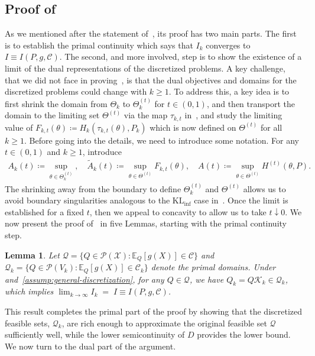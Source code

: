 \documentclass{article}
\theoremstyle{plain}
\newtheorem{lemma}[lemma]{Lemma}
\theoremstyle{definition}
\newcommand{\KLinf}{\operatorname{KL_{inf}}}
\newcommand{\calP}{\mathcal P}
\newcommand{\calC}{\mathcal C}
\newcommand{\calQ}{\mathcal Q}
\newcommand{\calX}{\mathcal X}
\newcommand{\calK}{\mathcal{K}}
\begin{document}
\subsection{Proof of~}
As we mentioned after the statement of~, its proof has two main parts. The first is to establish the primal continuity which says that $I_k$ converges to $I \equiv I(P, g, \calC)$. The second, and more involved, step is to show the existence of a limit of the dual representations of the discretized problems. A key challenge, that we did not face in proving~, is that the dual objectives and domains for the discretized problems could change with $k \geq 1$. To address this, a key idea is to first shrink the domain from $\Theta_k$ to $\Theta_k^{(t)}$ for $t \in (0,1)$, and then transport the domain to the limiting set $\Theta^{(t)}$ via the map $\tau_{k,t}$ in~, and study the limiting value of $F_{k,t}(\theta) \coloneqq H_k(\tau_{k,t}(\theta), P_k)$ which is now defined on $\Theta^{(t)}$ for all $k \geq 1$.  
Before going into the details, we need to introduce some notation. For any $t \in (0,1)$ and $k \geq 1$, introduce 
\begin{align}
    A_k(t) \coloneqq \sup_{\theta \in \Theta^{(t)}_k}, \quad 
    \widetilde{A}_k(t) \coloneqq \sup_{\theta \in \Theta^{(t)}} F_{k,t}(\theta), \quad 
    A(t) \coloneqq \sup_{\theta \in \Theta^{(t)}} H^{(t)}(\theta, P). \label{eq:A-terms}
\end{align}
The shrinking away from the boundary to define $\Theta^{(t)}_k$ and $\Theta^{(t)}$ allows us to avoid boundary singularities analogous to the $\KLinf$ case in~. Once the limit is established for a fixed $t$, then we appeal to concavity to allow us to take $t \downarrow 0$. 
We now present the proof of~ in five Lemmas, starting with  the primal continuity step. 
\begin{lemma}
    \label{lemma:approx-contraint-primal-1} 
    Let $\calQ = \{Q \in \calP(\calX): \mathbb{E}_Q[g(X)] \in \calC\}$ and $\calQ_k = \{Q \in \calP(V_k): \mathbb{E}_Q[g(X)] \in \calC_k\}$ denote the primal domains. 
    Under~ and~\ref{assump:general-discretization}, for any $Q \in \calQ$, we have  $Q_k = Q\calK_k \in \calQ_k$, which implies $\lim_{k \to \infty} I_k \;=\; I \equiv I(P, g, \calC)$.
\end{lemma}
This result completes the primal part of the proof by showing that the discretized feasible sets, $\calQ_k$, are rich enough to approximate the original feasible set $\calQ$ sufficiently well, while the lower semicontinuity of $D$ provides the lower bound. We now turn to the dual part of the argument. 
\end{document}
